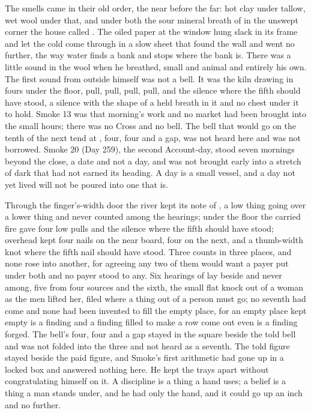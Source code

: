 The smells came in their old order, the near before the far: hot clay under tallow, wet wool under that, and under both the sour mineral breath of  in the unswept corner the house called . The oiled paper at the window hung slack in its frame and let the cold come through in a slow sheet that found the wall and went no further, the way water finds a bank and stops where the bank is. There was a little sound in the wool when he breathed, small and animal and entirely his own. The first sound from outside himself was not a bell. It was the kiln drawing in fours under the floor, pull, pull, pull, pull, and the silence where the fifth should have stood, a silence with the shape of a held breath in it and no chest under it to hold. Smoke 13 was that morning's work and no market had been brought into the small hours; there was no Cross and no bell. The bell that would go on the tenth of the next tend at , four, four and a gap, was not heard here and was not borrowed. Smoke 20 (Day 259), the second Account-day, stood seven mornings beyond the close, a date and not a day, and was not brought early into a stretch of dark that had not earned its heading. A day is a small vessel, and a day not yet lived will not be poured into one that is.

Through the finger's-width door the river kept its note of , a low thing going over a lower thing and never counted among the hearings; under the floor the carried fire gave four low pulls and the silence where the fifth should have stood; overhead  kept four nails on the near board, four on the next, and a thumb-width knot where the fifth nail should have stood. Three counts in three places, and none rose into another, for agreeing any two of them would want a payer put under both and no payer stood to any. Six hearings of  lay beside and never among, five from four sources and the sixth, the small flat knock out of a woman as the men lifted her, filed where a thing out of a person must go; no seventh had come and none had been invented to fill the empty place, for an empty place kept empty is a finding and a finding filled to make a row come out even is a finding forged. The bell's four, four and a gap stayed in the square beside the told bell and was not folded into the three and not heard as a seventh. The told figure stayed beside the paid figure, and Smoke's first arithmetic had gone up  in a locked box and answered nothing here. He kept the trays apart without congratulating himself on it. A discipline is a thing a hand uses; a belief is a thing a man stands under, and he had only the hand, and it could go up an inch and no further.

